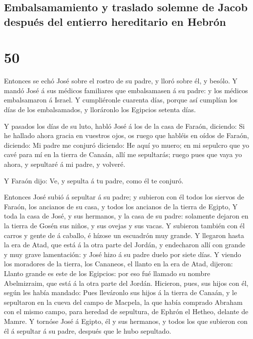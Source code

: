 \hypertarget{embalsamamiento-y-traslado-solemne-de-jacob-despuuxe9s-del-entierro-hereditario-en-hebruxf3n}{%
\subsection{Embalsamamiento y traslado solemne de Jacob después del
entierro hereditario en
Hebrón}\label{embalsamamiento-y-traslado-solemne-de-jacob-despuuxe9s-del-entierro-hereditario-en-hebruxf3n}}

\hypertarget{section-49}{%
\section{50}\label{section-49}}

 Entonces se echó José sobre el rostro de su padre, y
lloró sobre él, y besólo.  Y mandó José á sus médicos
familiares que embalsamasen á su padre: y los médicos embalsamaron á
Israel.  Y cumpliéronle cuarenta días, porque así cumplían
los días de los embalsamados, y lloráronlo los Egipcios setenta días.

 Y pasados los días de su luto, habló José á los de la
casa de Faraón, diciendo: Si he hallado ahora gracia en vuestros ojos,
os ruego que habléis en oídos de Faraón, diciendo:  Mi
padre me conjuró diciendo: He aquí yo muero; en mi sepulcro que yo cavé
para mí en la tierra de Canaán, allí me sepultarás; ruego pues que vaya
yo ahora, y sepultaré á mi padre, y volveré.

 Y Faraón dijo: Ve, y sepulta á tu padre, como él te
conjuró.

 Entonces José subió á sepultar á su padre; y subieron con
él todos los siervos de Faraón, los ancianos de su casa, y todos los
ancianos de la tierra de Egipto,  Y toda la casa de José,
y sus hermanos, y la casa de su padre: solamente dejaron en la tierra de
Gosén sus niños, y sus ovejas y sus vacas.  Y subieron
también con él carros y gente de á caballo, é hízose un escuadrón muy
grande.  Y llegaron hasta la era de Atad, que está á la
otra parte del Jordán, y endecharon allí con grande y muy grave
lamentación: y José hizo á su padre duelo por siete días.
 Y viendo los moradores de la tierra, los Cananeos, el
llanto en la era de Atad, dijeron: Llanto grande es este de los
Egipcios: por eso fué llamado su nombre Abelmizraim, que está á la otra
parte del Jordán.  Hicieron, pues, sus hijos con él,
según les había mandado:  Pues lleváronlo sus hijos á la
tierra de Canaán, y le sepultaron en la cueva del campo de Macpela, la
que había comprado Abraham con el mismo campo, para heredad de
sepultura, de Ephrón el Hetheo, delante de Mamre.  Y
tornóse José á Egipto, él y sus hermanos, y todos los que subieron con
él á sepultar á su padre, después que le hubo sepultado.

